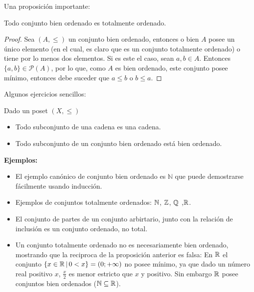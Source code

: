 \documentclass[12pt,a4paper]{book}
\begin{document}
Una proposición importante:
\begin{prop} %
Todo conjunto bien ordenado es totalmente ordenado.
\begin{proof}
Sea $(A,\leq)$ un conjunto bien ordenado, entonces o bien $A$ posee un único elemento (en el cual, es claro que es un conjunto totalmente ordenado) o tiene por lo menos dos elementos. Si es este el caso, sean $a,b \in A$. Entonces $\{ a,b \} \in \mathcal{P}(A)$, por lo que, como $A$ es bien ordenado, este conjunto posee mínimo, entonces debe suceder que $a \leq b$ o $b \leq a$.
\end{proof}
\end{prop}
Algunos ejercicios sencillos:
\begin{ej} Dado un poset $(X,\leq)$
\begin{itemize}
\item Todo subconjunto de una cadena es una cadena.
\item Todo subconjunto de un conjunto bien ordenado está bien ordenado.
\end{itemize}
\end{ej}
\textbf{ Ejemplos:} 
\begin{itemize}
\item El ejemplo canónico de conjunto bien ordenado es $ \mathbb{N}$ que puede demostrarse fácilmente usando inducción.
\item Ejemplos de conjuntos totalmente ordenados: $\mathbb{N}$, $\mathbb{Z}$, $\mathbb{Q}$ ,$\mathbb{R}$.
\item El conjunto de partes de un conjunto arbirtario, junto con la relación de inclusión es un conjunto ordenado, no total.
\item Un conjunto totalmente ordenado no es necesariamente bien ordenado, mostrando que la reciproca de la proposición anterior es falsa: En $\mathbb{R}$ el conjunto $\{ x \in \mathbb{R} \,\vert\,  0 < x \} = (0;+\infty)$ no posee mínimo, ya que dado un número real positivo $x$, $\frac{x}{2}$ es menor estricto que $x$ y positivo. Sin embargo $\mathbb{R}$ posee conjuntos bien ordenados ($\mathbb{N} \subseteq \mathbb{R}$).
\end{itemize}
 
\ifx\isEmbedded\undefined
\end{document}

